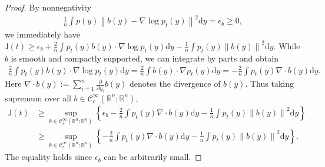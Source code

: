 \documentclass[10pt,a4paper]{amsart}
\newcommand{\R}{\mathbb{R}} %
\newcommand{\de}{\mathrm{d}}
\newcommand{\jfunc}{\mathsf{J}}
\newcommand{\mc}[1]{\mathcal{#1}}
\newcommand{\norm}[1]{\left\|{#1}\right\|} %
\begin{document}
\begin{proof}
    By nonnegativity
    \begin{align*}
        \frac{1}{n}\int p(y)\norm{b(y) - \nabla \log p_t(y)}^2 \de y = \epsilon_b \geq 0,
    \end{align*}
    we immediately have $\jfunc(t) \geq \epsilon_b + \frac{2}{n} \int p_t(y) b(y) \cdot \nabla \log p_t(y) \de y - \frac{1}{n}\int p_t(y) \norm{b(y)}^2 \de y$. While $b$ is smooth and compactly supported, we can integrate by parts and obtain
    \begin{align*}
        \frac{2}{n} \int p_t(y) b(y) \cdot \nabla \log p_t(y) \de y = \frac{2}{n}  \int b(y) \cdot \nabla p_t(y) \de y = -  \frac{2}{n}  \int p_t(y) \nabla \cdot b(y) \de y.
    \end{align*}
    Here $\nabla \cdot b(y) := \sum_{i=1}^n \frac{\partial}{\partial y_i} b(y)$ denotes the divergence of $b(y)$. Thus taking supremum over all $b \in \mc{C}_c^{\infty}(\R^n; \R^n)$,
    \begin{align*}
        \jfunc(t) & \geq \sup _{b \in \mc{C}_c^{\infty}(\R^n; \R^n)}\left\{ \epsilon_b - \frac{2}{n} \int p_t(y) \nabla \cdot b(y) \de y- \frac{1}{n}\int p_t(y) \norm{b(y)}^2 \de y \right\} \\
        & \geq \sup _{b \in \mc{C}_c^{\infty}(\R^n; \R^n)}\left\{- \frac{2}{n} \int p_t(y) \nabla \cdot b(y) \de y- \frac{1}{n}\int p_t(y) \norm{b(y)}^2 \de y\right\}.
    \end{align*}
    The equality holds since $\epsilon_b$ can be arbitrarily small.
\end{proof}
\end{document}
